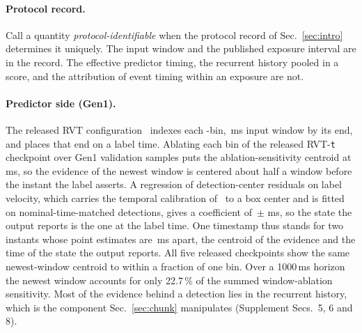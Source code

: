 \documentclass[10pt,twocolumn,letterpaper]{article}
\begin{document}
\paragraph{Protocol record.}
Call a quantity \emph{protocol-identifiable} when the protocol record of Sec.~\ref{sec:intro} determines it uniquely. The input window and the published exposure interval are in the record. The effective predictor timing, the recurrent history pooled in a score, and the attribution of event timing within an exposure are not.

\paragraph{Predictor side (Gen1).}
The released RVT configuration~\cite{gehrig2023rvt} indexes each \rvtBins-bin, \rvtWindow\,ms input
window by its end, and places that end on a label time. Ablating each bin of the released RVT-\texttt{t} checkpoint over \rvtInfluenceSamples{} Gen1
validation samples puts the ablation-sensitivity
centroid at \rvtCentroidMeas\,ms, so the evidence of the newest window is centered about half a window before the instant the label asserts. A regression of detection-center residuals on label velocity,
which carries the temporal calibration of~\cite{qin2018temporal} to a box center and is fitted on
nominal-time-matched detections, gives a coefficient of
\ladderFullTau\,$\pm$\,\ladderFullTauSE\,ms, so the state the output reports is the one at the label time. One timestamp thus stands for two instants whose point estimates are \outInterval\,ms apart, the centroid of the evidence and the time of the state the output reports. All five released checkpoints show the same newest-window centroid to within a fraction of one bin. Over a 1000\,ms horizon the newest window accounts for only 22.7\,\% of the
summed window-ablation sensitivity. Most of the evidence behind a detection lies in the recurrent history, which is the component Sec.~\ref{sec:chunk} manipulates (Supplement Secs.~5, 6 and 8).
\end{document}
